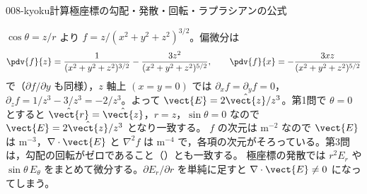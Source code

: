 \documentclass[uplatex,dvipdfmx,a4paper,11pt]{jsarticle}
\begin{document}
\begin{mondai}{008-kyoku}{計算}{極座標の勾配・発散・回転・ラプラシアンの公式}
\begin{tadashii}
 $\cos\theta = z/r$ より $f = z/(x^2 + y^2 + z^2)^{3/2}$。偏微分は
\[ \pdv{f}{z} = \frac{1}{(x^2 + y^2 + z^2)^{3/2}} - \frac{3z^2}{(x^2 + y^2 + z^2)^{5/2}}, \qquad \pdv{f}{x} = -\frac{3xz}{(x^2 + y^2 + z^2)^{5/2}} \]
で（$\partial f/\partial y$ も同様），$z$ 軸上 $(x = y = 0)$ では $\partial_xf = \partial_yf = 0$，$\partial_zf = 1/z^3 - 3/z^3 = -2/z^3$。よって $\vect{E} = 2\hat{\vect{z}}/z^3$。第1問で $\theta = 0$ とすると $\hat{\vect{r}} = \hat{\vect{z}}$，$r = z$，$\sin\theta = 0$ なので $\vect{E} = 2\hat{\vect{z}}/z^3$ となり一致する。
\kenzan $f$ の次元は $\unit{\metre}^{-2}$ なので $\vect{E}$ は $\unit{\metre}^{-3}$，$\nabla\cdot\vect{E}$ と $\nabla^2 f$ は $\unit{\metre}^{-4}$ で，各項の次元がそろっている。第3問は，勾配の回転がゼロであること（）とも一致する。
\tsumazuki 極座標の発散では $r^2E_r$ や $\sin\theta\,E_\theta$ をまとめて微分する。$\partial E_r/\partial r$ を単純に足すと $\nabla\cdot\vect{E} \neq 0$ になってしまう。
\end{tadashii}
\end{mondai}

\noteowari
\end{document}
